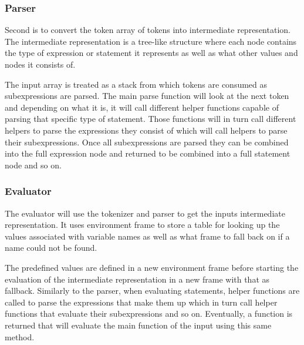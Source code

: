 \subsubsection{Parser}

Second is to convert the token array of tokens into intermediate representation. The intermediate representation is a tree-like structure where each node contains the type of expression or statement it represents as well as what other values and nodes it consists of.

The input array is treated as a stack from which tokens are consumed as subexpressions are parsed. The main parse function will look at the next token and depending on what it is, it will call different helper functions capable of parsing that specific type of statement. Those functions will in turn call different helpers to parse the expressions they consist of which will call helpers to parse their subexpressions. Once all subexpressions are parsed they can be combined into the full expression node and returned to be combined into a full statement node and so on.

\subsubsection{Evaluator}

The evaluator will use the tokenizer and parser to get the inputs intermediate representation. It uses environment frame to store a table for looking up the values associated with variable names as well as what frame to fall back on if a name could not be found.

The predefined values are defined in a new environment frame before starting the evaluation of the intermediate representation in a new frame with that as fallback. Similarly to the parser, when evaluating statements, helper functions are called to parse the expressions that make them up which in turn call helper functions that evaluate their subexpressions and so on. Eventually, a function is returned that will evaluate the main function of the input using this same method.

